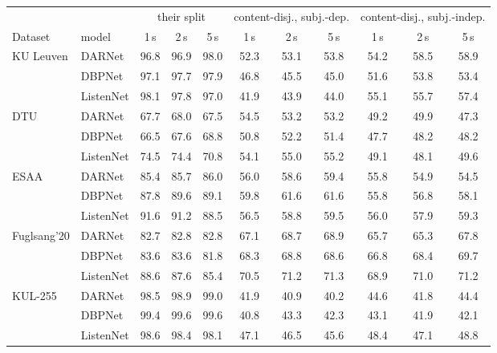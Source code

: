 \begin{tabular}{llccc|ccc|ccc}\toprule
 & & \multicolumn{3}{c|}{their split} & \multicolumn{3}{c|}{content-disj., subj.-dep.} & \multicolumn{3}{c}{content-disj., subj.-indep.} \\
Dataset & model & 1\,s & 2\,s & 5\,s & 1\,s & 2\,s & 5\,s & 1\,s & 2\,s & 5\,s \\\midrule
KU Leuven & DARNet & 96.8 & 96.9 & 98.0 & 52.3 & 53.1 & 53.8 & 54.2 & 58.5 & 58.9 \\
 & DBPNet & 97.1 & 97.7 & 97.9 & 46.8 & 45.5 & 45.0 & 51.6 & 53.8 & 53.4 \\
 & ListenNet & 98.1 & 97.8 & 97.0 & 41.9 & 43.9 & 44.0 & 55.1 & 55.7 & 57.4 \\
\midrule
DTU & DARNet & 67.7 & 68.0 & 67.5 & 54.5 & 53.2 & 53.2 & 49.2 & 49.9 & 47.3 \\
 & DBPNet & 66.5 & 67.6 & 68.8 & 50.8 & 52.2 & 51.4 & 47.7 & 48.2 & 48.2 \\
 & ListenNet & 74.5 & 74.4 & 70.8 & 54.1 & 55.0 & 55.2 & 49.1 & 48.1 & 49.6 \\
\midrule
ESAA & DARNet & 85.4 & 85.7 & 86.0 & 56.0 & 58.6 & 59.4 & 55.8 & 54.9 & 54.5 \\
 & DBPNet & 87.8 & 89.6 & 89.1 & 59.8 & 61.6 & 61.6 & 55.8 & 56.8 & 58.1 \\
 & ListenNet & 91.6 & 91.2 & 88.5 & 56.5 & 58.8 & 59.5 & 56.0 & 57.9 & 59.3 \\
\midrule
Fuglsang'20 & DARNet & 82.7 & 82.8 & 82.8 & 67.1 & 68.7 & 68.9 & 65.7 & 65.3 & 67.8 \\
 & DBPNet & 83.6 & 83.6 & 81.8 & 68.3 & 68.8 & 68.6 & 66.8 & 68.4 & 69.7 \\
 & ListenNet & 88.6 & 87.6 & 85.4 & 70.5 & 71.2 & 71.3 & 68.9 & 71.0 & 71.2 \\
\midrule
KUL-255 & DARNet & 98.5 & 98.9 & 99.0 & 41.9 & 40.9 & 40.2 & 44.6 & 41.8 & 44.4 \\
 & DBPNet & 99.4 & 99.6 & 99.6 & 40.8 & 43.3 & 42.3 & 43.1 & 41.9 & 42.1 \\
 & ListenNet & 98.6 & 98.4 & 98.1 & 47.1 & 46.5 & 45.6 & 48.4 & 47.1 & 48.8 \\
\bottomrule\end{tabular}
